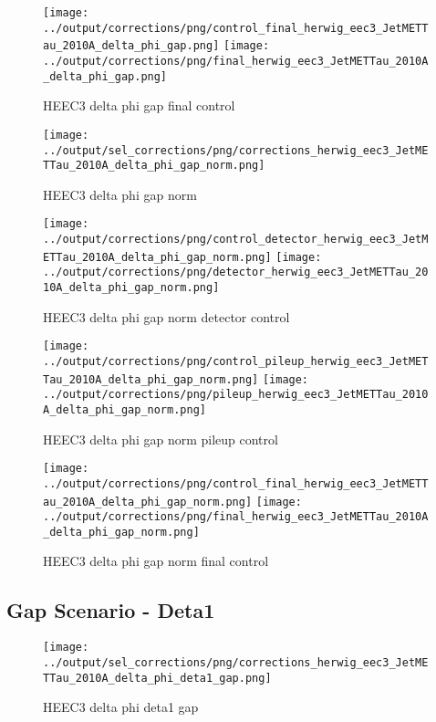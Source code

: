 \documentclass[11pt]{book}
\begin{document}
\begin{figure}[ht]
\centering
\texttt{[image: ../output/corrections/png/control\_final\_herwig\_eec3\_JetMETTau\_2010A\_delta\_phi\_gap.png]}
\texttt{[image: ../output/corrections/png/final\_herwig\_eec3\_JetMETTau\_2010A\_delta\_phi\_gap.png]}
\caption{HEEC3 delta phi gap final control}
\label{fig:HEEC3_JetMETTau_2010A_delta_phi_gap_final_control}
\end{figure}


\begin{figure}[ht]
\centering
\texttt{[image: ../output/sel\_corrections/png/corrections\_herwig\_eec3\_JetMETTau\_2010A\_delta\_phi\_gap\_norm.png]}
\caption{HEEC3 delta phi gap norm}
\label{fig:HEEC3_JetMETTau_2010A_delta_phi_gap_norm}
\end{figure}

\begin{figure}[ht]
\centering
\texttt{[image: ../output/corrections/png/control\_detector\_herwig\_eec3\_JetMETTau\_2010A\_delta\_phi\_gap\_norm.png]}
\texttt{[image: ../output/corrections/png/detector\_herwig\_eec3\_JetMETTau\_2010A\_delta\_phi\_gap\_norm.png]}
\caption{HEEC3 delta phi gap norm detector control}
\label{fig:HEEC3_JetMETTau_2010A_delta_phi_gap_norm_detector_control}
\end{figure}

\begin{figure}[ht]
\centering
\texttt{[image: ../output/corrections/png/control\_pileup\_herwig\_eec3\_JetMETTau\_2010A\_delta\_phi\_gap\_norm.png]}
\texttt{[image: ../output/corrections/png/pileup\_herwig\_eec3\_JetMETTau\_2010A\_delta\_phi\_gap\_norm.png]}
\caption{HEEC3 delta phi gap norm pileup control}
\label{fig:HEEC3_JetMETTau_2010A_delta_phi_gap_norm_pileup_control}
\end{figure}


\begin{figure}[ht]
\centering
\texttt{[image: ../output/corrections/png/control\_final\_herwig\_eec3\_JetMETTau\_2010A\_delta\_phi\_gap\_norm.png]}
\texttt{[image: ../output/corrections/png/final\_herwig\_eec3\_JetMETTau\_2010A\_delta\_phi\_gap\_norm.png]}
\caption{HEEC3 delta phi gap norm final control}
\label{fig:HEEC3_JetMETTau_2010A_delta_phi_gap_norm_final_control}
\end{figure}



\clearpage
\subsection{Gap Scenario - Deta1}
\begin{figure}[ht]
\centering
\texttt{[image: ../output/sel\_corrections/png/corrections\_herwig\_eec3\_JetMETTau\_2010A\_delta\_phi\_deta1\_gap.png]}
\caption{HEEC3 delta phi deta1 gap}
\label{fig:HEEC3_JetMETTau_2010A_delta_phi_deta1_gap}
\end{figure}
\end{document}
